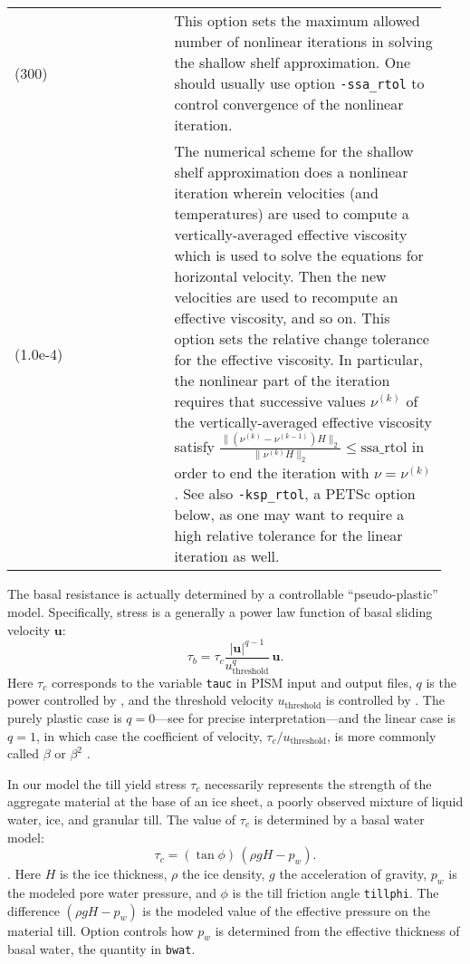 \begin{center}
\begin{xtabular}{p{0.35\linewidth}p{0.6\linewidth}}
 (300) & This option sets the maximum allowed number of nonlinear iterations in solving the shallow shelf approximation.  One should usually use option \texttt{-ssa_rtol} to control convergence of the nonlinear iteration.\\
 (1.0e-4) & The numerical scheme for the shallow shelf approximation \cite{WeisGreveHutter} does a nonlinear iteration wherein velocities (and temperatures) are used to compute a vertically-averaged effective viscosity which is used to solve the equations for horizontal velocity.  Then the new velocities are used to recompute an effective viscosity, and so on.  This option sets the relative change tolerance for the effective viscosity.
In particular, the nonlinear part of the iteration requires that successive values $\nu^{(k)}$ of the vertically-averaged effective viscosity satisfy
	$\frac{\|(\nu^{(k)} - \nu^{(k-1)}) H\|_2}{\|\nu^{(k)} H\|_2} \le \text{ssa_rtol}$
in order to end the iteration with $\nu = \nu^{(k)}$.  See also \texttt{-ksp_rtol}, a PETSc option below, as one may want to require a high relative tolerance for the linear iteration as well.\\
\end{xtabular}
\end{center}

The basal resistance is actually determined by a controllable ``pseudo-plastic'' model.  Specifically, stress is a generally a power law function of basal sliding velocity $\mathbf{u}$:
   $$\tau_b = \tau_c \frac{|\mathbf{u}|^{q-1}}{u_{\text{threshold}}^q}\, \mathbf{u}.$$
Here $\tau_c$ corresponds to the variable \texttt{tauc} in PISM input and output files, $q$ is the power controlled by , and the threshold velocity $u_{\text{threshold}}$ is controlled by .  The purely plastic case is $q=0$---see \cite{SchoofStream} for precise interpretation---and the linear case is $q=1$, in which case the coefficient of velocity, $\tau_c/u_{\text{threshold}}$, is more commonly called $\beta$ or $\beta^2$ \cite{MacAyeal}.

In our model the till yield stress $\tau_c$ necessarily represents the strength of the aggregate material at the base of an ice sheet, a poorly observed mixture of liquid water, ice, and granular till.  The value of $\tau_c$ is determined by a basal water model:
\begin{equation*}
   \tau_c = (\tan\phi)\,(\rho g H - p_w).
\end{equation*}
\cite[Chapter 8]{Paterson}.  Here $H$ is the ice thickness, $\rho$ the ice density, $g$ the acceleration of gravity, $p_w$ is the modeled pore water pressure, and $\phi$ is the till friction angle \texttt{tillphi}.  The difference $(\rho g H - p_w)$ is the modeled value of the effective pressure on the material till.  Option  controls how $p_w$ is determined from the effective thickness of basal water, the quantity in \texttt{bwat}.


